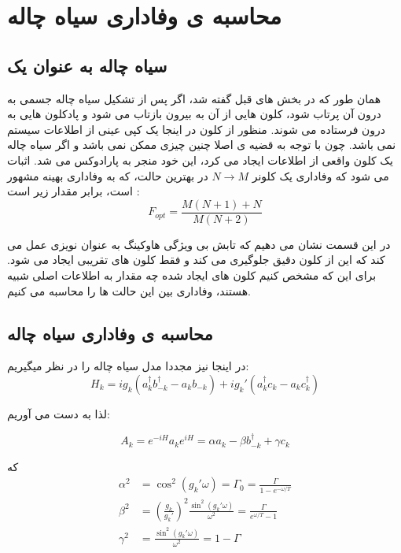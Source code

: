 \section{محاسبه ی وفاداری سیاه چاله}
\subsection{سیاه چاله به عنوان یک }
همان طور که در بخش های قبل گفته شد، اگر پس از تشکیل سیاه چاله جسمی به درون آن پرتاب شود، کلون هایی از آن به بیرون بازتاب می شود و پادکلون هایی به درون فرستاده می شوند. منظور از کلون در اینجا یک کپی عینی از اطلاعات سیستم نمی باشد. چون با توجه به قضیه ی 
اصلا چنین چیزی ممکن نمی باشد و اگر سیاه چاله یک کلون واقعی از اطلاعات ایجاد می کرد، این خود منجر به پارادوکس می شد. اثبات می شود که وفاداری یک کلونر 
$N \to M$
 در بهترین حالت، که به وفاداری بهینه 
مشهور است،  برابر مقدار زیر است
\cite{cloner}
:
\begin{equation} \label{fidopt}
	F_{opt} = \frac{M(N+1)+N}{M(N+2)}
\end{equation}

در این قسمت نشان می دهیم که تابش بی ویژگی هاوکینگ به عنوان نویزی عمل می کند که این از کلون دقیق جلوگیری می کند و فقط کلون های تقریبی ایجاد می شود. برای این که مشخص کنیم کلون های ایجاد شده چه مقدار به اطلاعات اصلی شبیه هستند، وفاداری بین این حالت ها را محاسبه می کنیم.

\subsection{محاسبه ی وفاداری سیاه چاله}
در اینجا نیز مجددا مدل 
سیاه چاله را در نظر میگیریم:
\begin{equation}
H_k =  i g_k (a_k^\dagger b_{-k}^\dagger - a_k b_{-k}) + i g_k ' (a_k^\dagger c_k - a_k c_k^\dagger)
\end{equation}

لذا به دست می آوریم:

\begin{equation}
A_k = e^{-i H} a_k e^{i H} = \alpha a_k - \beta b_{-k}^\dagger + \gamma c_k
\end{equation}

که 
\begin{align}
\alpha ^2 &= \cos ^2(g_k ' \omega) = \Gamma_0 = \frac{\Gamma}{1-e^{-\omega/T}} \\
\beta ^2 & = (\frac{g_k}{g_k '})^2 \frac{\sin ^2 (g_k ' \omega)}{\omega^2} = \frac{\Gamma}{e^{\omega/T}-1}  \\
\gamma^2 & = \frac{\sin ^2 (g_k ' \omega)}{\omega^2} = 1 - \Gamma
\end{align}

